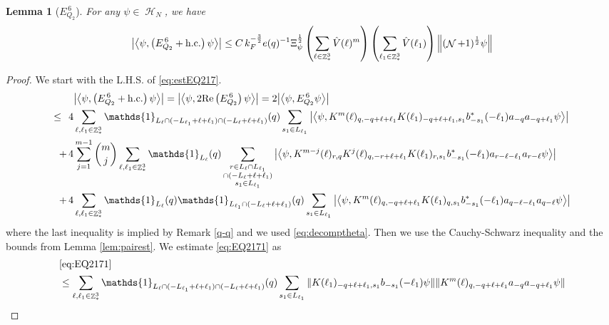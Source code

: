 \documentclass[sn-mathphys, Numbered ,a4paper]{sn-jnl}%
\DeclareMathOperator{\Z}{\mathbb{Z}}
\DeclareMathOperator{\HH}{\mathcal{H}}
\DeclareMathOperator{\NN}{\mathcal{N}}
\newcommand{\half}{\frac{1}{2}}
\newcommand{\eva}[1]{\left\langle #1 \right\rangle}
\theoremstyle{plain}
\newtheorem{lemma}[theorem]{Lemma}
\theoremstyle{definition}
\theoremstyle{remark}
\theoremstyle{plain}
\theoremstyle{definition}
\theoremstyle{remark}
\begin{document}
\begin{lemma}[$E_{Q_2}^{\,6}$]\label{lem:EQ217}
	For any $\psi \in \HH_N$, we have
	\begin{align}
		\abs{\eva{\psi,\left(E^{\,6}_{Q_2}+\mathrm{h.c.}\right) \psi }}
		\leq C\, k_{F}^{-\frac{3}{2}} e(q)^{-1} \Xi_{\psi}^{\half} \left(\sum\limits_{\ell\in \Z^3_*} \hat{V}(\ell)^m \right) \left(\sum\limits_{\ell_1\in \Z^3_*} \hat{V}(\ell_1) \right) \norm{(\NN+1)^\half \psi } \label{eq:estEQ217}
	\end{align}
\end{lemma}
\begin{proof}
 We start with the L.H.S. of \eqref{eq:estEQ217}.
\begin{align}
	&\abs{\eva{\psi,\left(E^{\,6}_{Q_2}+\mathrm{h.c.}\right) \psi }} = \abs{\eva{\psi,2\mathrm{Re}\left(E^{\,6}_{Q_2}\right) \psi }} = 2\abs{\eva{\psi, E^{\,6}_{Q_2} \psi }}\nonumber\\
	\leq\,\;4& \sum\limits_{\ell, \ell_1\in \Z^3_*} \mathds{1}_{L_{\ell} \cap (-L_{\ell_1}+\ell+\ell_1) \cap (-L_{\ell}+\ell+\ell_1)}(q) \sum\limits_{s_1 \in L_{\ell_1}} \abs{\eva{\psi, K^m(\ell)_{q,-q+\ell+\ell_1} K(\ell_1)_{-q+\ell+\ell_1,s_1} b^*_{-s_1}(-\ell_1) a_{-q} a_{-q+\ell_1} \psi}} \label{eq:EQ2171}\\
	+\,4& \sum\limits_{j=1}^{m-1} {{m}\choose j} \sum\limits_{\ell, \ell_1\in \Z^3_*}\mathds{1}_{L_{\ell}}(q) \sum\limits_{\substack{r\in L_{\ell} \cap L_{\ell_1} \\ \cap (-L_{\ell}+\ell+\ell_1)\\s_1\in L_{\ell_1}}}  \abs{\eva{\psi, K^{m-j}(\ell)_{r,q} K^j(\ell)_{q,-r+\ell+\ell_1} K(\ell_1)_{r,s_1} b^*_{-s_1}(-\ell_1)a_{r-\ell-\ell_1}a_{r-\ell} \psi }} \label{eq:EQ2172}\\
	+\,4&\sum\limits_{\ell, \ell_1\in \Z^3_*} \mathds{1}_{L_{\ell}}(q) \mathds{1}_{L_{\ell_1}\cap (-L_{\ell}+\ell+\ell_1)}(q) \sum\limits_{s_1\in L_{\ell_1}} \abs{\eva{\psi, K^m(\ell)_{q,-q+\ell+\ell_1} K(\ell_1)_{q,s_1} b^*_{-s_1}(-\ell_1)a_{q-\ell-\ell_1}a_{q-\ell} \psi }} \label{eq:EQ2173}
\end{align}
where the last inequality is implied by Remark \ref{q-q} and we used \eqref{eq:decomptheta}.
Then we use the Cauchy-Schwarz inequality and the bounds from Lemma \ref{lem:pairest}.
We estimate \eqref{eq:EQ2171} as 
\begin{align}
	&\eqref{eq:EQ2171}\nonumber\\
	&\leq \sum\limits_{\ell, \ell_1\in \Z^3_*} \mathds{1}_{L_{\ell} \cap (-L_{\ell_1}+\ell+\ell_1) \cap (-L_{\ell}+\ell+\ell_1)}(q) \sum\limits_{s_1 \in L_{\ell_1}} \norm{  K(\ell_1)_{-q+\ell+\ell_1,s_1} b_{-s_1}(-\ell_1) \psi}\norm{ K^m(\ell)_{q,-q+\ell+\ell_1}a_{-q}a_{-q+\ell_1} \psi }\nonumber\\

\end{align}
\end{proof}
\end{document}
